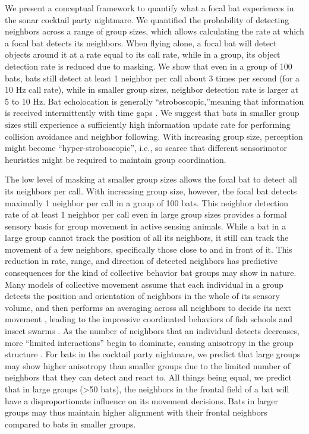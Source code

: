 \documentclass[
]{book}
\begin{document}
We present a conceptual framework to quantify what a focal bat experiences in the sonar cocktail party nightmare. We quantified the probability of detecting neighbors across a range of group sizes, which allows calculating the rate at which a focal bat detects its neighbors. When flying alone, a focal bat will detect objects around it at a rate equal to its call rate, while in a group, its object detection rate is reduced due to masking. We show that even in a group of 100 bats, bats still detect at least 1 neighbor per call about 3 times per second (for a 10 Hz call rate), while in smaller group sizes, neighbor detection rate is larger at 5 to 10 Hz. Bat echolocation is generally ``stroboscopic,''meaning that information is received intermittently with time gaps \citep{griffin1958a}. We suggest that bats in smaller group sizes still experience a sufficiently high information update rate for performing collision avoidance and neighbor following. With increasing group size, perception might become ``hyper-stroboscopic'', i.e., so scarce that different sensorimotor heuristics might be required to maintain group coordination.

The low level of masking at smaller group sizes allows the focal bat to detect all its neighbors per call. With increasing group size, however, the focal bat detects maximally 1 neighbor per call in a group of 100 bats. This neighbor detection rate of at least 1 neighbor per call even in large group sizes provides a formal sensory basis for group movement in active sensing animals. While a bat in a large group cannot track the position of all its neighbors, it still can track the movement of a few neighbors, specifically those close to and in front of it. This reduction in rate, range, and direction of detected neighbors has predictive consequences for the kind of collective behavior bat groups may show in nature. Many models of collective movement assume that each individual in a group detects the position and orientation of neighbors in the whole of its sensory volume, and then performs an averaging across all neighbors to decide its next movement \citep{couzin2002a, g2004a, t1995a, reynolds1987a}, leading to the impressive coordinated behaviors of fish schools and insect swarms \citep{sumpter2006a, vicsek2012a}. As the number of neighbors that an individual detects decreases, more ``limited interactions'' begin to dominate, causing anisotropy in the group structure \citep{bode2011a, ballerini2008a}. For bats in the cocktail party nightmare, we predict that large groups may show higher anisotropy than smaller groups due to the limited number of neighbors that they can detect and react to. All things being equal, we predict that in large groups (\textgreater50 bats), the neighbors in the frontal field of a bat will have a disproportionate influence on its movement decisions. Bats in larger groups may thus maintain higher alignment with their frontal neighbors compared to bats in smaller groups.
\end{document}
